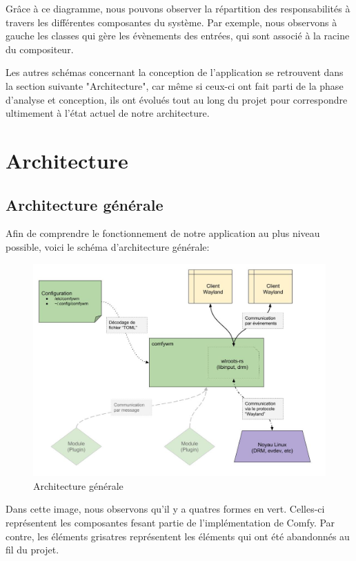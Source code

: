 \documentclass[titlepage]{article}
\begin{document}
\par
Grâce à ce diagramme, nous pouvons observer la répartition des responsabilités à travers les différentes composantes du système. Par exemple, nous observons à gauche les classes qui gère les évènements des entrées, qui sont associé à la racine du compositeur.
\bigskip

\par
Les autres schémas concernant la conception de l'application se retrouvent dans la section suivante "Architecture", car même si ceux-ci ont fait parti de la phase d'analyse et conception, ils ont évolués tout au long du projet pour correspondre ultimement à l'état actuel de notre architecture.
\bigskip

\section{Architecture}
\subsection{Architecture générale}
\par
Afin de comprendre le fonctionnement de notre application au plus niveau possible, voici le schéma d'architecture générale:
\bigskip

\begin{figure}[H]
	\centering
	\includegraphics[width=\textwidth]{architecture_generale_v1.jpg}
	\caption{Architecture générale}
\end{figure}

\par
Dans cette image, nous observons qu'il y a quatres formes en vert. Celles-ci représentent les composantes fesant partie de l'implémentation de Comfy. Par contre, les éléments grisatres représentent les éléments qui ont été abandonnés au fil du projet.
\bigskip
\end{document}
